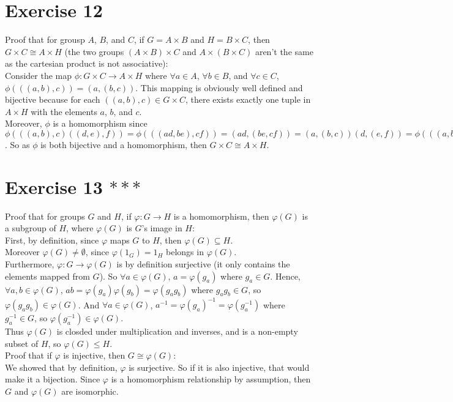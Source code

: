 \documentclass{article}
\begin{document}
    \section*{Exercise 12}
    Proof that for grousp $A$, $B$, and $C$, if $G = A \times B$
    and $H = B \times C$, then $G \times C \cong A \times H$
    (the two groups $(A \times B) \times C$ and $A \times (B \times C)$
    aren't the same as the cartesian product is not associative): \\
    Consider the map $\phi: G \times C \to A \times H$
    where $\forall a \in A$, $\forall b \in B$, and $\forall c \in C$,
    $\phi(((a, b), c)) = (a, (b, c))$.
    This mapping is obviously well defined and bijective
    because for each $((a, b), c) \in G \times C$,
    there exists exactly one tuple in $A \times H$ with the elements
    $a$, $b$, and $c$. \\
    Moreover, $\phi$ is a homomorphism 
    since $\phi(((a, b), c)((d, e), f)) = \phi(((ad, be), cf))
    = (ad, (be, cf))
    = (a, (b, c))(d, (e, f))
    = \phi(((a, b), c))\phi(((d, e), f))$.
    So as $\phi$ is both bijective and a homomorphism,
    then $G \times C \cong A \times H$.


    \section*{Exercise 13 $***$}
    Proof that for groups $G$ and $H$,
    if $\varphi: G \to H$ is a homomorphism,
    then $\varphi(G)$ is a subgroup of $H$,
    where $\varphi(G)$ is $G$'s image in $H$: \\
    First, by definition, since $\varphi$ maps $G$ to $H$,
    then $\varphi(G) \subseteq H$. \\
    Moreover $\varphi(G) \neq \emptyset$,
    since $\varphi(1_G) = 1_H$ belongs in $\varphi(G)$. \\
    Furthermore, $\varphi: G \to \varphi(G)$ is by definition surjective
    (it only contains the elements mapped from $G$).
    So $\forall a \in \varphi(G)$, $a = \varphi(g_a)$ where $g_a \in G$.
    Hence, $\forall a, b \in \varphi(G)$,
    $ab = \varphi(g_a)\varphi(g_b) = \varphi(g_ag_b)$
    where $g_ag_b \in G$,
    so $\varphi(g_ag_b) \in \varphi(G)$.
    And $\forall a \in \varphi(G)$,
    $a^{-1} = \varphi(g_a)^{-1} = \varphi(g_a^{-1})$
    where $g_a^{-1} \in G$,
    so $\varphi(g_a^{-1}) \in \varphi(G)$. \\
    Thus $\varphi(G)$ is closded under multiplication and inverses,
    and is a non-empty subset of $H$,
    so $\varphi(G) \leqslant H$. \\
    Proof that if $\varphi$ is injective, then $G \cong \varphi(G)$: \\
    We showed that by definition, $\varphi$ is surjective.
    So if it is also injective, that would make it a bijection.
    Since $\varphi$ is a homomorphism relationship by assumption,
    then $G$ and $\varphi(G)$ are isomorphic.
\end{document}
